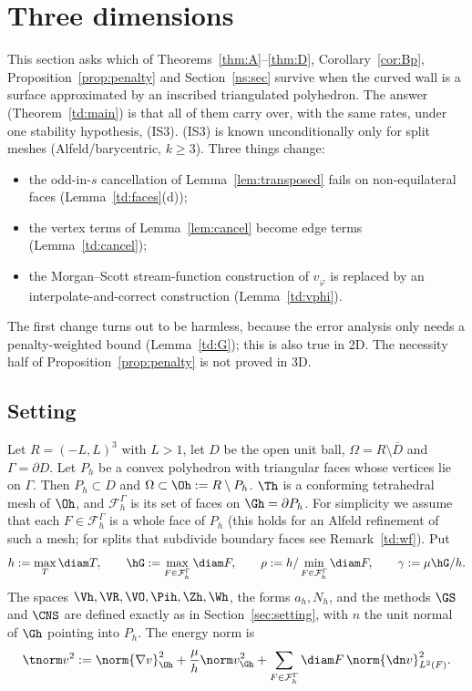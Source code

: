 
\providecommand{\FG}{\mathcal F_h^\Gamma}
\providecommand{\epsd}{\varepsilon_h^{(3)}}

\section{Three dimensions}\label{td:sec}

This section asks which of Theorems~\ref{thm:A}--\ref{thm:D}, Corollary~\ref{cor:Bp}, Proposition~\ref{prop:penalty} and Section~\ref{ns:sec} survive when the curved wall is a surface approximated by an inscribed triangulated polyhedron. The answer (Theorem~\ref{td:main}) is that all of them carry over, with the same rates, under one stability hypothesis, (IS3). (IS3) is known unconditionally only for split meshes (Alfeld/barycentric, $k\ge3$). Three things change:
\begin{itemize}
\item the odd-in-$s$ cancellation of Lemma~\ref{lem:transposed} fails on non-equilateral faces (Lemma~\ref{td:faces}(d));
\item the vertex terms of Lemma~\ref{lem:cancel} become edge terms (Lemma~\ref{td:cancel});
\item the Morgan--Scott stream-function construction of $v_\varphi$ is replaced by an interpolate-and-correct construction (Lemma~\ref{td:vphi}).
\end{itemize}
The first change turns out to be harmless, because the error analysis only needs a penalty-weighted bound (Lemma~\ref{td:G}); this is also true in 2D. The necessity half of Proposition~\ref{prop:penalty} is not proved in 3D.

\subsection{Setting}\label{td:setting}
Let $R=(-L,L)^3$ with $L>1$, let $D$ be the open unit ball, $\Omega=R\setminus\overline D$ and $\Gamma=\partial D$. Let $P_h$ be a convex polyhedron with triangular faces whose vertices lie on $\Gamma$. Then $P_h\subset D$ and $\Omega\subset\Oh:=R\setminus P_h$. $\Th$ is a conforming tetrahedral mesh of $\Oh$, and $\FG$ is its set of faces on $\Gh=\partial P_h$. For simplicity we assume that each $F\in\FG$ is a whole face of $P_h$ (this holds for an Alfeld refinement of such a mesh; for splits that subdivide boundary faces see Remark~\ref{td:wf}). Put
\[
h:=\max_T\diam T,\qquad \hG:=\max_{F\in\FG}\diam F,\qquad \rho:=h/\min_{F\in\FG}\diam F,\qquad \gamma:=\mu\hG/h .
\]
The spaces $\Vh,\VR,\VO,\Pih,\Zh,\Wh$, the forms $a_h,N_h$, and the methods $\GS$ and $\CNS$ are defined exactly as in Section~\ref{sec:setting}, with $n$ the unit normal of $\Gh$ pointing into $P_h$. The energy norm is
\[
\tnorm v^2:=\norm{\nabla v}^2_{\Oh}+\frac\mu h\norm v^2_{\Gh}+\sum_{F\in\FG}\diam F\,\norm{\dn v}^2_{L^2(F)} .
\]

